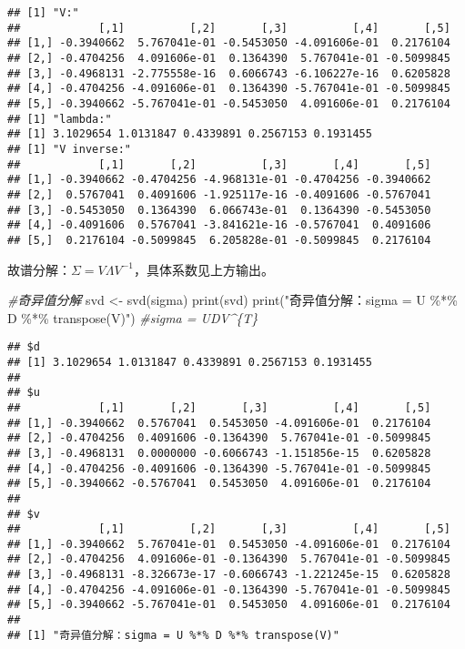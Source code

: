 \documentclass[
]{article}
\newenvironment{Shaded}{\begin{snugshade}}{\end{snugshade}}
\newcommand{\CommentTok}[1]{\textcolor[rgb]{0.56,0.35,0.01}{\textit{#1}}}
\newcommand{\FunctionTok}[1]{\textcolor[rgb]{0.00,0.00,0.00}{#1}}
\newcommand{\NormalTok}[1]{#1}
\newcommand{\OtherTok}[1]{\textcolor[rgb]{0.56,0.35,0.01}{#1}}
\newcommand{\StringTok}[1]{\textcolor[rgb]{0.31,0.60,0.02}{#1}}
\begin{document}
\begin{verbatim}
## [1] "V:"
##            [,1]          [,2]       [,3]          [,4]       [,5]
## [1,] -0.3940662  5.767041e-01 -0.5453050 -4.091606e-01  0.2176104
## [2,] -0.4704256  4.091606e-01  0.1364390  5.767041e-01 -0.5099845
## [3,] -0.4968131 -2.775558e-16  0.6066743 -6.106227e-16  0.6205828
## [4,] -0.4704256 -4.091606e-01  0.1364390 -5.767041e-01 -0.5099845
## [5,] -0.3940662 -5.767041e-01 -0.5453050  4.091606e-01  0.2176104
## [1] "lambda:"
## [1] 3.1029654 1.0131847 0.4339891 0.2567153 0.1931455
## [1] "V inverse:"
##            [,1]       [,2]          [,3]       [,4]       [,5]
## [1,] -0.3940662 -0.4704256 -4.968131e-01 -0.4704256 -0.3940662
## [2,]  0.5767041  0.4091606 -1.925117e-16 -0.4091606 -0.5767041
## [3,] -0.5453050  0.1364390  6.066743e-01  0.1364390 -0.5453050
## [4,] -0.4091606  0.5767041 -3.841621e-16 -0.5767041  0.4091606
## [5,]  0.2176104 -0.5099845  6.205828e-01 -0.5099845  0.2176104
\end{verbatim}

故谱分解：\(\Sigma=V\Lambda V^{-1}\)，具体系数见上方输出。

\begin{Shaded}
\begin{Highlighting}[]
\CommentTok{\#奇异值分解}
\NormalTok{svd }\OtherTok{\textless{}{-}} \FunctionTok{svd}\NormalTok{(sigma)}
\FunctionTok{print}\NormalTok{(svd)}
\FunctionTok{print}\NormalTok{(}\StringTok{"奇异值分解：sigma = U \%*\% D \%*\% transpose(V)"}\NormalTok{) }\CommentTok{\#sigma = UDV\^{}\{T\}}
\end{Highlighting}
\end{Shaded}

\begin{verbatim}
## $d
## [1] 3.1029654 1.0131847 0.4339891 0.2567153 0.1931455
## 
## $u
##            [,1]       [,2]       [,3]          [,4]       [,5]
## [1,] -0.3940662  0.5767041  0.5453050 -4.091606e-01  0.2176104
## [2,] -0.4704256  0.4091606 -0.1364390  5.767041e-01 -0.5099845
## [3,] -0.4968131  0.0000000 -0.6066743 -1.151856e-15  0.6205828
## [4,] -0.4704256 -0.4091606 -0.1364390 -5.767041e-01 -0.5099845
## [5,] -0.3940662 -0.5767041  0.5453050  4.091606e-01  0.2176104
## 
## $v
##            [,1]          [,2]       [,3]          [,4]       [,5]
## [1,] -0.3940662  5.767041e-01  0.5453050 -4.091606e-01  0.2176104
## [2,] -0.4704256  4.091606e-01 -0.1364390  5.767041e-01 -0.5099845
## [3,] -0.4968131 -8.326673e-17 -0.6066743 -1.221245e-15  0.6205828
## [4,] -0.4704256 -4.091606e-01 -0.1364390 -5.767041e-01 -0.5099845
## [5,] -0.3940662 -5.767041e-01  0.5453050  4.091606e-01  0.2176104
## 
## [1] "奇异值分解：sigma = U %*% D %*% transpose(V)"
\end{verbatim}
\end{document}
